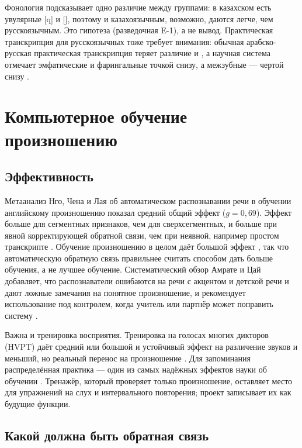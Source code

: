 Фонология подсказывает одно различие между группами: в казахском есть увулярные [q] и [], поэтому
 и  казахоязычным, возможно, даются легче, чем русскоязычным. Это гипотеза (разведочная E-1), а не
вывод. Практическая транскрипция для русскоязычных тоже требует внимания: обычная арабско-русская
практическая транскрипция теряет различие  и , а научная система отмечает эмфатические и
фарингальные точкой снизу, а межзубные --- чертой снизу \cite{SRC-051}.

\section{Компьютерное обучение произношению}\label{sec:lr-capt}

\subsection{Эффективность}

Метаанализ Нго, Чена и Лая об автоматическом распознавании речи в обучении английскому произношению
показал средний общий эффект ($g=0{,}69$). Эффект больше для сегментных признаков, чем для
сверхсегментных, и больше при явной корректирующей обратной связи, чем при неявной, например простом
транскрипте \cite{SRC-025}. Обучение произношению в целом даёт большой эффект \cite{SRC-105}, так что
автоматическую обратную связь правильнее считать способом дать больше обучения, а не лучшее обучение.
Систематический обзор Амрате и Цай добавляет, что распознаватели ошибаются на речи с акцентом и детской
речи и дают ложные замечания на понятное произношение, и рекомендует использование под контролем, когда
учитель или партнёр может поправить систему \cite{SRC-026}.

Важна и тренировка восприятия. Тренировка на голосах многих дикторов (HVPT) даёт средний или большой и
устойчивый эффект на различение звуков \cite{SRC-044} и меньший, но реальный перенос на произношение
\cite{SRC-045}. Для запоминания распределённая практика --- один из самых надёжных эффектов науки об
обучении \cite{SRC-107}. Тренажёр, который проверяет только произношение, оставляет место для
упражнений на слух и интервального повторения; проект записывает их как будущие функции.

\subsection{Какой должна быть обратная связь}


